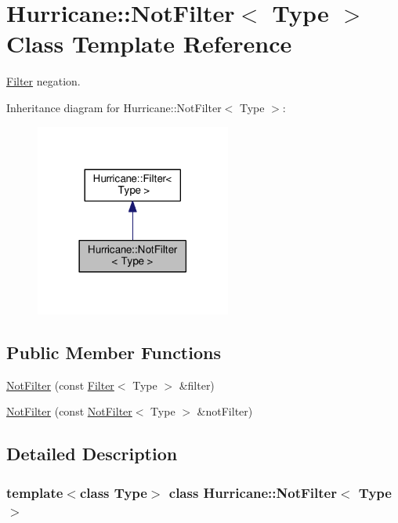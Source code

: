 \hypertarget{classHurricane_1_1NotFilter}{}\section{Hurricane\+:\+:Not\+Filter$<$ Type $>$ Class Template Reference}
\label{classHurricane_1_1NotFilter}


\hyperlink{classHurricane_1_1Filter}{Filter} negation.  




Inheritance diagram for Hurricane\+:\+:Not\+Filter$<$ Type $>$\+:\nopagebreak
\begin{figure}[H]
\begin{center}
\leavevmode
\includegraphics[width=182pt]{classHurricane_1_1NotFilter__inherit__graph}
\end{center}
\end{figure}
\subsection*{Public Member Functions}
\begin{DoxyCompactItemize}
\item 
\hyperlink{classHurricane_1_1NotFilter_a8c75f2e192929c1b559f4ca876e47126}{Not\+Filter} (const \hyperlink{classHurricane_1_1Filter}{Filter}$<$ Type $>$ \&filter)
\item 
\hyperlink{classHurricane_1_1NotFilter_a232102dc584111a704e66b2ac793af86}{Not\+Filter} (const \hyperlink{classHurricane_1_1NotFilter}{Not\+Filter}$<$ Type $>$ \&not\+Filter)
\end{DoxyCompactItemize}


\subsection{Detailed Description}
\subsubsection*{template$<$class Type$>$\newline
class Hurricane\+::\+Not\+Filter$<$ Type $>$}


